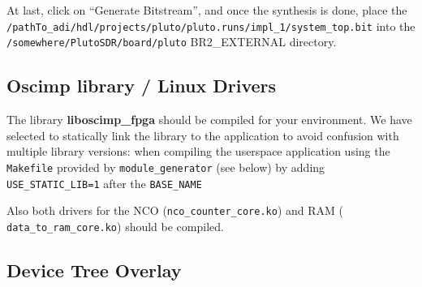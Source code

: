 \documentclass[12pt,oneside]{article}
\begin{document}
At last, click on ``Generate Bitstream'', and once the synthesis is done, place
the {\tt /pathTo\_adi/hdl/projects/pluto/pluto.runs/impl\_1/system\_top.bit}
into the \\{\tt /somewhere/PlutoSDR/board/pluto} BR2\_EXTERNAL directory.

\subsection{Oscimp library / Linux Drivers}
The library {\bf{liboscimp\_fpga}} should be compiled for your environment. We have selected
to statically link the library to the application to avoid confusion with multiple library
versions: when compiling the userspace application using the {\tt Makefile} provided by
{\tt module\_generator} (see below) by adding {\tt USE\_STATIC\_LIB=1} after the
{\tt BASE\_NAME}

Also both drivers for the NCO ({\tt nco\_counter\_core.ko}) and RAM ({\tt
data\_to\_ram\_core.ko}) should be compiled. 

\subsection{Device Tree Overlay}

%
%
%
%
%
%
%
%
%
%
%
\end{document}
